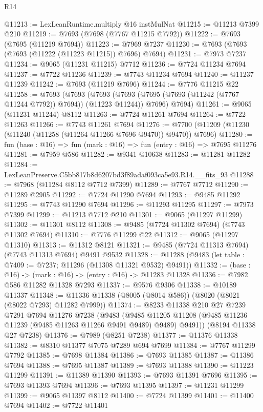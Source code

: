\begin{lexlean}{R14}
\begin{coremodule}
@11213 := LexLeanRuntime.multiply @16 instMulNat
@11215 := @11213 @7399 @210
@11219 := @7693 (@7698 (@7767 @11215 @7792))
@11222 := @7693 (@7695 (@11219 @7694))
@11223 := @7969 @7237
@11230 := @7693 (@7693 (@7693 (@11222 (@11223 @11215)) @7696) @7694)
@11231 := @7973 @7237
@11234 := @9065 (@11231 @11215) @7712
@11236 := @7724 @11234 @7694
@11237 := @7722 @11236
@11239 := @7743 @11234 @7694
@11240 := @11237 @11239
@11242 := @7693 (@11219 @7696)
@11244 := @7776 @11215 @22
@11258 := @7693
    (@7693
      (@7693 (@7693 (@7695 (@7693 (@11242 (@7767 @11244 @7792)) @7694)) (@11223 @11244)) @7696)
      @7694)
@11261 := @9065 (@11231 @11244) @8112
@11263 := @7724 @11261 @7694
@11264 := @7722 @11263
@11266 := @7743 @11261 @7694
@11276 := @7700 (@11209 (@11230 (@11240 (@11258 (@11264 @11266 @7696 @9470)) @9470)) @7696)
@11280 := fun (base : @16) => fun (mark : @16) => fun (entry : @16) => @7695 @11276
@11281 := @7959 @586
@11282 := @9341 @10638
@11283 := @11281 @11282
@11284 := LexLeanPreserve.C5bb817b8d6207bd3f89adaf093ca5e93.R14.__fits_93
@11288 := @7968 (@11284 @8112 @7712 @7399)
@11289 := @7767 @7712
@11290 := @11289 @2905
@11292 := @7724 @11290 @7694
@11293 := @9485 @11292
@11295 := @7743 @11290 @7694
@11296 := @11293 @11295
@11297 := @7973 @7399
@11299 := @11213 @7712 @210
@11301 := @9065 (@11297 @11299)
@11302 := @11301 @8112
@11308 := @9485 (@7724 @11302 @7694) (@7743 @11302 @7694)
@11310 := @7776 @11299 @22
@11312 := @9065 (@11297 @11310)
@11313 := @11312 @8121
@11321 := @9485 (@7724 @11313 @7694) (@7743 @11313 @7694) @9491 @9532
@11328 := @11288 (@9483 (let table : @7409 := @7237; @11296 (@11308 @11321 @9532) @9491))
@11332 := (base : @16) -> (mark : @16) -> (entry : @16) -> @11283 @11328
@11336 := @7982 @586 @11282 @11328 @7293
@11337 := @9576 @9306
@11338 := @10189 @11337
@11348 := @11336 @11338 (@8005 (@8014 @586)) (@8020 (@8021 (@8022 @7293) @11282 @7999))
@11374 := @8233
    @11338
    @210
    @27
    @7239
    @7291
    @7694
    @11276
    @7238
    (@9483
      (@9485 @11205 @11208 (@9485 @11236 @11239 (@9485 @11263 @11266 @9491 @9489) @9489) @9491))
    (@8194 @11338 @27 @7238)
@11376 := @7989 (@8251 @7238)
@11377 := @11376 @11338
@11382 := @8310 @11377 @7075 @7289 @694 @7699
@11384 := @7767 @11299 @7792
@11385 := @7698 @11384
@11386 := @7693 @11385
@11387 := @11386 @7694
@11388 := @7695 @11387
@11389 := @7693 @11388
@11390 := @11223 @11299
@11391 := @11389 @11390
@11393 := @7693 @11391 @7696
@11395 := @7693 @11393 @7694
@11396 := @7693 @11395
@11397 := @11231 @11299
@11399 := @9065 @11397 @8112
@11400 := @7724 @11399
@11401 := @11400 @7694
@11402 := @7722 @11401

\end{coremodule}
\end{lexlean}
